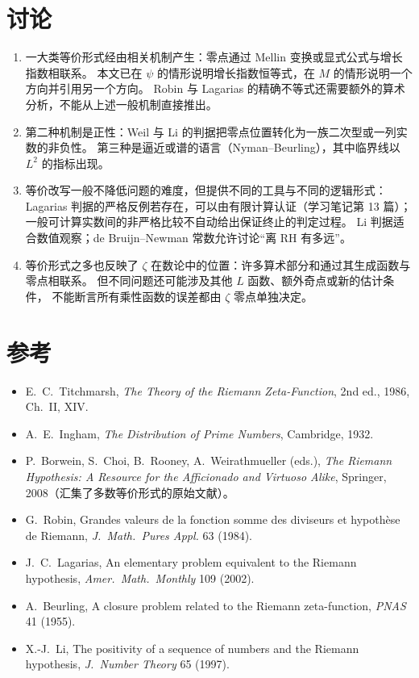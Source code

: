 \documentclass[11pt]{article}
\begin{document}
\section{讨论}
\begin{enumerate}
 \item 一大类等价形式经由相关机制产生：零点通过 Mellin 变换或显式公式与增长指数相联系。
 本文已在 $\psi$ 的情形说明增长指数恒等式，在 $M$ 的情形说明一个方向并引用另一个方向。
 Robin 与 Lagarias 的精确不等式还需要额外的算术分析，不能从上述一般机制直接推出。
 \item 第二种机制是正性：Weil 与 Li 的判据把零点位置转化为一族二次型或一列实数的非负性。
 第三种是逼近或谱的语言（Nyman--Beurling），其中临界线以 $L^2$ 的指标出现。
 \item 等价改写一般不降低问题的难度，但提供不同的工具与不同的逻辑形式：
 Lagarias 判据的严格反例若存在，可以由有限计算认证（学习笔记第 13 篇）；
 一般可计算实数间的非严格比较不自动给出保证终止的判定过程。
 Li 判据适合数值观察；de Bruijn--Newman 常数允许讨论“离 RH 有多远”。
 \item 等价形式之多也反映了 $\zeta$ 在数论中的位置：许多算术部分和通过其生成函数与零点相联系。
 但不同问题还可能涉及其他 $L$ 函数、额外奇点或新的估计条件，
 不能断言所有乘性函数的误差都由 $\zeta$ 零点单独决定。
\end{enumerate}

\section*{参考}
\begin{itemize}
 \item E.\ C.\ Titchmarsh, \emph{The Theory of the Riemann Zeta-Function}, 2nd ed., 1986, Ch.~II, XIV.
 \item A.\ E.\ Ingham, \emph{The Distribution of Prime Numbers}, Cambridge, 1932.
 \item P.\ Borwein, S.\ Choi, B.\ Rooney, A.\ Weirathmueller (eds.), \emph{The Riemann Hypothesis: A Resource for the Afficionado and Virtuoso Alike}, Springer, 2008（汇集了多数等价形式的原始文献）。
 \item G.\ Robin, Grandes valeurs de la fonction somme des diviseurs et hypothèse de Riemann, \emph{J.\ Math.\ Pures Appl.} 63 (1984).
 \item J.\ C.\ Lagarias, An elementary problem equivalent to the Riemann hypothesis, \emph{Amer.\ Math.\ Monthly} 109 (2002).
 \item A.\ Beurling, A closure problem related to the Riemann zeta-function, \emph{PNAS} 41 (1955).
 \item X.-J.\ Li, The positivity of a sequence of numbers and the Riemann hypothesis, \emph{J.\ Number Theory} 65 (1997).
\end{itemize}
\end{document}
